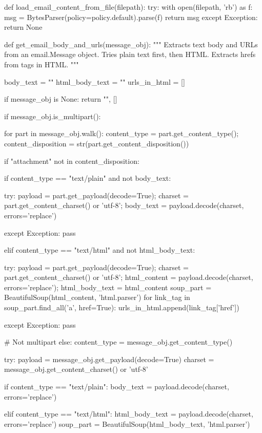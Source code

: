 \begin{ffcode}
def load_email_content_from_file(filepath):
try:
    with open(filepath, 'rb') as f: msg = BytesParser(policy=policy.default).parse(f)
    return msg
except Exception: return None
    

def get_email_body_and_urls(message_obj):
"""
Extracts text body and URLs from an email.Message object.
Tries plain text first, then HTML. Extracts hrefs from  tags in HTML.
"""

body_text = ""
html_body_text = ""
urls_in_html = []

if message_obj is None: return "", []

if message_obj.is_multipart():

    for part in message_obj.walk():
        content_type = part.get_content_type(); content_disposition = str(part.get_content_disposition())

        if "attachment" not in content_disposition:

            if content_type == "text/plain" and not body_text:

                try:
                    payload = part.get_payload(decode=True); charset = part.get_content_charset() or 'utf-8'; body_text = payload.decode(charset, errors='replace')

                except Exception: pass

            elif content_type == "text/html" and not html_body_text:

                try:
                    payload = part.get_payload(decode=True); charset = part.get_content_charset() or 'utf-8'; html_content = payload.decode(charset, errors='replace'); html_body_text = html_content
                    soup_part = BeautifulSoup(html_content, 'html.parser')
                    for link_tag in soup_part.find_all('a', href=True): urls_in_html.append(link_tag['href'])

                except Exception: pass

# Not multipart
else:
    content_type = message_obj.get_content_type()

    try:
        payload = message_obj.get_payload(decode=True)
        charset = message_obj.get_content_charset() or 'utf-8'

        if content_type == "text/plain":
            body_text = payload.decode(charset, errors='replace')

        elif content_type == "text/html":
            html_body_text = payload.decode(charset, errors='replace')
            soup_part = BeautifulSoup(html_body_text, 'html.parser')


\end{ffcode}
